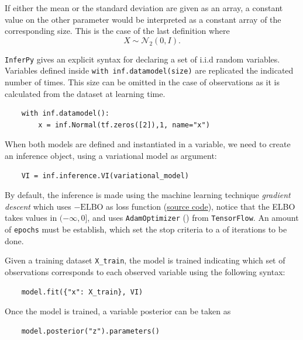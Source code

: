 If either the mean or the standard deviation are given as an array, a constant value on the other parameter would be interpreted as a constant array of the corresponding size. This is the case of the last definition where
\[
  X \sim \mathcal{N}_{2}(0,I).
\]

\texttt{InferPy} gives an explicit syntax for declaring a set of i.i.d random variables. Variables defined inside \texttt{with inf.datamodel(size)} are replicated the indicated number of times. This size can be omitted in the case of observations as it is calculated from the dataset at learning time.
\begin{verbatim}
    with inf.datamodel():
        x = inf.Normal(tf.zeros([2]),1, name="x")
\end{verbatim}

When both models are defined and instantiated in a variable, we need to create an inference object, using a variational model as argument:
\begin{verbatim}
    VI = inf.inference.VI(variational_model)
\end{verbatim}

By default, the inference is made using the machine learning technique \emph{gradient descent} which uses \(-\text{ELBO}\) as loss function (\href{https://github.com/PGM-Lab/InferPy/blob/master/inferpy/inference/variational/loss_functions/elbo.py}{source code}), notice that the ELBO takes values in \((-\infty, 0]\),  and uses \texttt{AdamOptimizer} (\cite{kingma2014adam}) from \texttt{TensorFlow}. An amount of \texttt{epochs} must be establish, which set the stop criteria to a of iterations to be done.

Given a training dataset \texttt{X\_train}, the model is trained indicating which set of observations corresponds to each observed variable using the following syntax:
\begin{verbatim}
    model.fit({"x": X_train}, VI)
\end{verbatim}
Once the model is trained, a variable posterior can be taken as
\begin{verbatim}
    model.posterior("z").parameters()
\end{verbatim}
